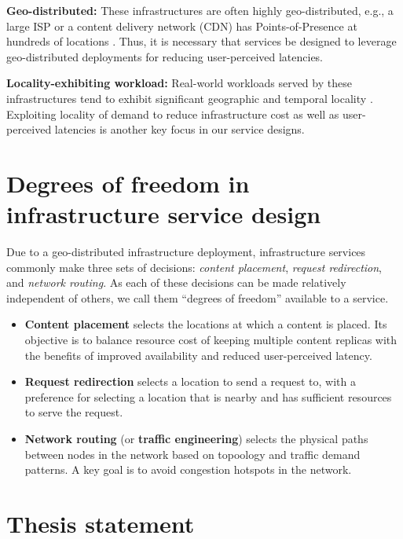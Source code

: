 \textbf{Geo-distributed:} These infrastructures are often highly geo-distributed, e.g., a large ISP or a content delivery network (CDN) has Points-of-Presence  at hundreds of locations \cite{dilley2002globally}. Thus, it is necessary that services be designed to leverage geo-distributed deployments for reducing user-perceived latencies.

\textbf{Locality-exhibiting workload:} Real-world workloads served by these infrastructures tend to exhibit significant geographic and temporal locality \cite{NCDN, youtubeUGC, vodP2Pbenefit, cellularvideotraffic}. Exploiting locality of demand to reduce infrastructure cost as well as user-perceived latencies is another key focus in our service designs.

\section{Degrees of freedom in infrastructure service design} 

Due to a geo-distributed infrastructure deployment, infrastructure services commonly make three sets of decisions: \emph{content placement}, \emph{request redirection}, and \emph{network routing}. As each of these decisions can be made relatively independent of others, we call them ``degrees of freedom'' available to a service.

\begin{itemize}
	\item
	\textbf{Content placement} selects the locations at which a content is placed. Its objective  is to balance resource cost of keeping multiple content replicas with the benefits of improved availability and reduced user-perceived latency.
	\item
	\textbf{Request redirection} selects a location to send a request to, with a preference for selecting a location that is nearby and has sufficient resources to serve the request.
	\item
	\textbf{Network routing} (or \textbf{traffic engineering}) selects the physical paths between nodes in the network based on topoology and traffic demand patterns. A key goal is to avoid congestion hotspots in the network.
\end{itemize}


\section{Thesis statement}



